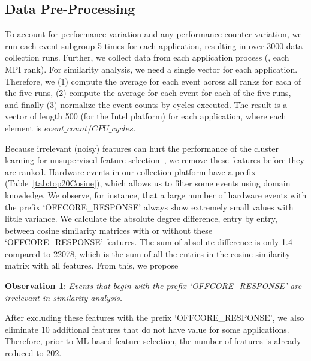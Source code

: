 \subsection{Data Pre-Processing}
\label{sec:prep}
To account for performance variation and any performance counter variation, we run each event subgroup 5 times for each application, resulting in over 3000 data-collection runs.  Further, we collect data from each application process (\ie, each MPI rank).  For similarity analysis, we need a single vector for each application.  
Therefore, we (1) compute the average for each event across all ranks for each of the five runs, (2) compute the average for each event for each of the five runs, and finally (3) normalize the event counts by cycles executed. The result is a vector of length 500 (for the Intel platform) for each application, where each element is 
$event\_count/CPU\_cycles$.  

Because irrelevant (noisy) features can hurt the performance of the cluster learning for unsupervised feature selection~\cite{lindenbaum2021differentiable}, we remove these features before they are ranked. %
Hardware events in our collection platform have a prefix (Table~\ref{tab:top20Cosine}), which allows us to filter some events using domain knowledge.
We observe, for instance, that a large number of hardware events with the prefix `OFFCORE\_RESPONSE' always show extremely small values with little variance. We calculate the absolute degree difference, entry by entry, between cosine similarity matrices with or without these `OFFCORE\_RESPONSE' features. The sum of absolute difference is only 1.4 compared to 22078, which is the sum of all the entries in the cosine similarity matrix with all features.  From this, we propose 
\begin{mdframed}
\textbf{Observation 1}: \textit{Events that begin with the prefix `OFFCORE\_RESPONSE' are irrelevant in similarity analysis.} \end{mdframed}

After excluding these features with the prefix `OFFCORE\_RESPONSE', we also eliminate 10 additional features that do not have value for some applications. Therefore, prior to ML-based feature selection, the number of features is already reduced to 202.

